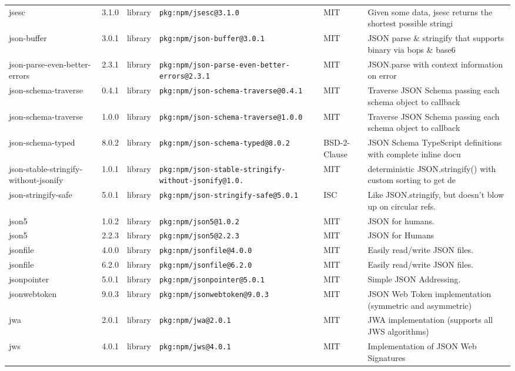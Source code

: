 \documentclass[11pt]{article}
\begin{document}
\begin{longtable}{|l|l|l|p{2.2cm}|l|p{4cm}|}
jsesc & 3.1.0 & library & \texttt{pkg:npm/jsesc@3.1.0} & MIT & Given some data, jsesc returns the shortest possible stringi \\
json-buffer & 3.0.1 & library & \texttt{pkg:npm/json-buffer@3.0.1} & MIT & JSON parse \& stringify that supports binary via bops \& base6 \\
json-parse-even-better-errors & 2.3.1 & library & \texttt{pkg:npm/json-parse-even-better-errors@2.3.1} & MIT & JSON.parse with context information on error \\
json-schema-traverse & 0.4.1 & library & \texttt{pkg:npm/json-schema-traverse@0.4.1} & MIT & Traverse JSON Schema passing each schema object to callback \\
json-schema-traverse & 1.0.0 & library & \texttt{pkg:npm/json-schema-traverse@1.0.0} & MIT & Traverse JSON Schema passing each schema object to callback \\
json-schema-typed & 8.0.2 & library & \texttt{pkg:npm/json-schema-typed@8.0.2} & BSD-2-Clause & JSON Schema TypeScript definitions with complete inline docu \\
json-stable-stringify-without-jsonify & 1.0.1 & library & \texttt{pkg:npm/json-stable-stringify-without-jsonify@1.0.} & MIT & deterministic JSON.stringify() with custom sorting to get de \\
json-stringify-safe & 5.0.1 & library & \texttt{pkg:npm/json-stringify-safe@5.0.1} & ISC & Like JSON.stringify, but doesn't blow up on circular refs. \\
json5 & 1.0.2 & library & \texttt{pkg:npm/json5@1.0.2} & MIT & JSON for humans. \\
json5 & 2.2.3 & library & \texttt{pkg:npm/json5@2.2.3} & MIT & JSON for Humans \\
jsonfile & 4.0.0 & library & \texttt{pkg:npm/jsonfile@4.0.0} & MIT & Easily read/write JSON files. \\
jsonfile & 6.2.0 & library & \texttt{pkg:npm/jsonfile@6.2.0} & MIT & Easily read/write JSON files. \\
jsonpointer & 5.0.1 & library & \texttt{pkg:npm/jsonpointer@5.0.1} & MIT & Simple JSON Addressing. \\
jsonwebtoken & 9.0.3 & library & \texttt{pkg:npm/jsonwebtoken@9.0.3} & MIT & JSON Web Token implementation (symmetric and asymmetric) \\
jwa & 2.0.1 & library & \texttt{pkg:npm/jwa@2.0.1} & MIT & JWA implementation (supports all JWS algorithms) \\
jws & 4.0.1 & library & \texttt{pkg:npm/jws@4.0.1} & MIT & Implementation of JSON Web Signatures \\

\end{longtable}
\end{document}
